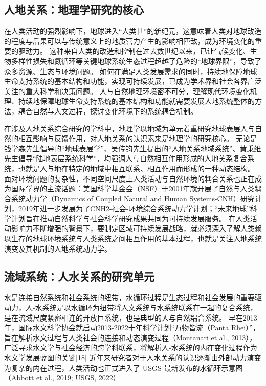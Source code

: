 \subsection{人地关系：地理学研究的核心}

在人类活动的强烈影响下，地球进入“人类世”的新纪元，这意味着人类对地球改造的程度与后果可以与传统意义上的地质营力产生的影响相匹敌，成为环境变化的重要的驱动力\cite{lenton2019, lewis2015, lewis2018}。
这种来自人类的改造和控制在过去数世纪以来，已让气候变化、生物多样性损失和氮循环等关键地球系统生态过程超越了危险的“地球界限”，导致了众多资源、生态与环境问题\cite{steffen2015}。
如何在满足人类发展需求的同时，持续地保障地球生命支持系统的基本结构和功能，实现可持续发展，已成为学术界和社会各界广泛关注的重大科学和决策问题\cite{wu2014}。
人与自然地理环境密不可分，理解现代环境变化机理、持续地保障地球生命支持系统的基本结构和功能就需要发展人地系统整体的方法，耦合自然与人文过程，探讨变化环境下的系统耦合机制\cite{fu2015}。

在涉及人地关系综合研究的学科中，地理学以地域为单元着重研究地球表层人与自然的相互影响与反馈作用，对人地关系的认识素来是地理学的研究核心\cite{wu1991}。
无论是钱学森先生倡导的“地球表层学”、吴传钧先生提出的“人地关系地域系统”、黄秉维先生倡导“陆地表层系统科学”，均强调人与自然相互作用形成的人地关系复合系统，也就是人与地在特定的地域中相互联系、相互作用而形成的一种动态结构。
面对环境问题的复杂性，不同空间尺度上人类活动与自然环境的耦合关系也正在成为国际学界的主流话题\cite{fu2015}：美国科学基金会（NSF）于2001年就开展了自然与人类耦合系统动力学（Dynamics of Coupled Natural and Human Systems-CNH）研究计划，2019年进一步发展为了CNH2-社会-环境综合系统动力学计划；“未来地球”科学计划旨在推动自然科学与社会科学研究成果共同为可持续发展服务。
在人类活动影响力不断增强的背景下，要制定区域可持续发展战略，就必须深入了解人类赖以生存的地球环境系统与人类系统之间相互作用的基本过程，也就是关注人地系统演变及其机制的人地系统动力学\cite{fu2022}。

\subsection{流域系统：人水关系的研究单元}

水是连接自然系统和社会系统的纽带，水循环过程是生态过程和社会发展的重要驱动力，人-水系统是以水循环为纽带将人文系统与水系统联系在一起的复合系统，是在流域尺度紧密相连的开放巨系统，也是典型的人与自然耦合系统\cite{li2007}。
早在2013年，国际水文科学协会就启动2013-2022十年科学计划“万物皆流（Panta Rhei）”，旨在解析水文过程与人类社会的连接和动态演变过程（Montanari et al., 2013），广泛寻求水文学与社会经济的跨学科联系，将解析人-水系统的内在变化过程作为水文学发展蓝图的关键[18] %
近年来研究者对于人水关系的认识逐渐由外部动力演变为复杂的内在过程，人类活动也正式进入了 USGS 最新发布的水循环示意图（Abbott et al., 2019; USGS, 2022）

